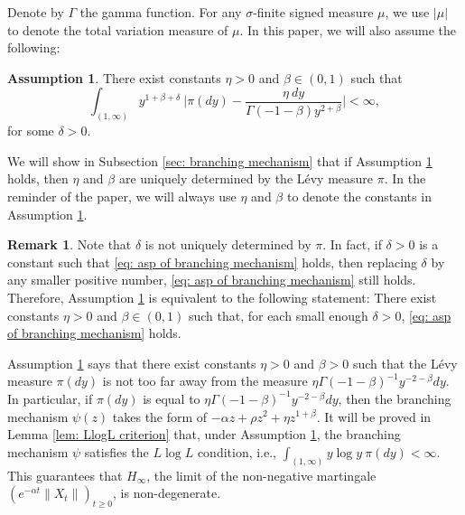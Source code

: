 \documentclass[12pt,a4paper]{amsart}
\theoremstyle{plain}
\theoremstyle{definition}
\newtheorem{rem}[thm]{Remark}
\newtheorem{asp}{Assumption}
\numberwithin{equation}{section}
\begin{document}
    Denote by $\Gamma$ the gamma function.
For any $\sigma$-finite signed measure $\mu$, we use $|\mu|$ to denote the total variation measure of $\mu$.
    In this paper, we will also assume the following:
\begin{asp}
\label{asp: branching mechanism}
    There exist constants $\eta > 0$ and $\beta \in (0,1)$ such that
\begin{equation}
\label{eq: asp of branching mechanism}
    \int_{(1,\infty)}y^{1+\beta +\delta}~\Big|\pi(dy)-\frac{\eta~dy}{\Gamma(-1-\beta)y^{2+\beta}}\Big| <\infty,
\end{equation}
	for some $\delta > 0$.
\end{asp}
	We will show in Subsection \ref{sec: branching mechanism} that if Assumption \ref{asp: branching mechanism} holds, then $\eta$ and $\beta$ are uniquely determined by the L\'evy measure $\pi$.
	In the reminder of the paper, we will always use $\eta$ and $\beta$ to denote the constants in Assumption  \ref{asp: branching mechanism}.


\begin{rem}
\label{rem: small enough delta}
	Note that $\delta$ is not uniquely determined by $\pi$.
	In fact, if $\delta>0$ is a constant such that \eqref{eq: asp of branching mechanism} holds, then replacing $\delta$ by any smaller positive number, \eqref{eq: asp of branching mechanism} still holds.
	Therefore, Assumption \ref{asp: branching mechanism} is equivalent to the following statement: 
	There exist constants $\eta > 0$ and $\beta \in (0,1)$ such that, for each small enough $\delta>0$, \eqref{eq: asp of branching mechanism} holds.
\end{rem}

    Assumption \ref{asp: branching mechanism} says that
 there exist constants $\eta>0$ and $\beta > 0$
    such that the L\'evy measure $\pi(dy)$ is not too far away from the measure $\eta \Gamma(-1-\beta)^{-1}y^{-2-\beta} dy$.
    In particular, if $\pi(dy)$ is equal to $\eta \Gamma(-1-\beta)^{-1}y^{-2-\beta} dy$, then the branching mechanism $\psi(z)$
    takes the form of
	$-\alpha z + \rho z^2 + \eta z^{1+\beta}$.
	It will be proved in Lemma \ref{lem: LlogL criterion} that, under Assumption
	\ref{asp: branching mechanism}, the branching mechanism $\psi$ satisfies the
	$L \log L$ condition, i.e.,
$
	\int_{(1,\infty)} y\log y~\pi(dy) < \infty.
$
    This guarantees that $H_\infty$, the limit of the non-negative martingale $(e^{-\alpha t} \|X_t\|)_{t\geq 0}$, is non-degenerate.
\end{document}
